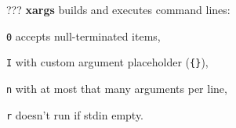 \begin{compactenum}
	\item [???] \textbf{xargs} builds and executes command lines:
	\item [\texttt{0}] accepts null-terminated items,
	\item [\texttt{I}] with custom argument placeholder (\texttt{\{\}}),
	\item [\texttt{n}] with at most that many arguments per line,
	\item [\texttt{r}] doesn't run if stdin empty.
\end{compactenum}
